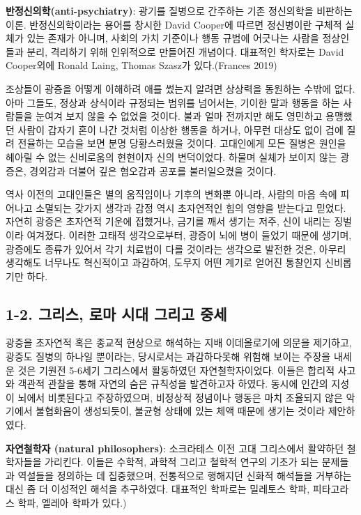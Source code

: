 \documentclass[
]{article}
\begin{document}
\textbf{반정신의학(anti-psychiatry)}: 광기를 질병으로 간주하는 기존
정신의학을 비판하는 이론. 반정신의학이라는 용어를 창시한 David Cooper에
따르면 정신병이란 구체적 실체가 있는 존재가 아니며, 사회의 가치 기준이나
행동 규범에 어긋나는 사람을 정상인들과 분리, 격리하기 위해 인위적으로
만들어진 개념이다. 대표적인 학자로는 David Cooper외에 Ronald Laing,
Thomas Szasz가 있다.(Frances 2019)

조상들이 광증을 어떻게 이해하려 애를 썼는지 알려면 상상력을 동원하는
수밖에 없다. 아마 그들도, 정상과 상식이라 규정되는 범위를 넘어서는,
기이한 말과 행동을 하는 사람들을 눈여겨 보지 않을 수 없었을 것이다. 불과
얼마 전까지만 해도 영민하고 용맹했던 사람이 갑자기 혼이 나간 것처럼
이상한 행동을 하거나, 아무런 대상도 없이 겁에 질려 전율하는 모습을 보면
분명 당황스러웠을 것이다. 고대인에게 모든 질병은 원인을 헤아릴 수 없는
신비로움의 현현이자 신의 변덕이었다. 하물며 실체가 보이지 않는 광증은,
경외감과 더불어 깊은 혐오감과 공포를 불러일으켰을 것이다.

역사 이전의 고대인들은 별의 움직임이나 기후의 변화뿐 아니라, 사람의 마음
속에 피어나고 소멸되는 갖가지 생각과 감정 역시 초자연적인 힘의 영향을
받는다고 믿었다. 자연히 광증은 초자연적 기운에 접했거나, 금기를 깨서
생기는 저주, 신이 내리는 징벌이라 여겨졌다. 이러한 고태적 생각으로부터,
광증이 뇌에 병이 들었기 때문에 생기며, 광증에도 종류가 있어서 각기
치료법이 다를 것이라는 생각으로 발전한 것은, 아무리 생각해도 너무나도
혁신적이고 과감하여, 도무지 어떤 계기로 얻어진 통찰인지 신비롭기만 하다.

\hypertarget{uxadf8uxb9acuxc2a4-uxb85cuxb9c8-uxc2dcuxb300-uxadf8uxb9acuxace0-uxc911uxc138}{%
\subsection{1-2. 그리스, 로마 시대 그리고
중세}\label{uxadf8uxb9acuxc2a4-uxb85cuxb9c8-uxc2dcuxb300-uxadf8uxb9acuxace0-uxc911uxc138}}

광증을 초자연적 혹은 종교적 현상으로 해석하는 지배 이데올로기에 의문을
제기하고, 광증도 질병의 하나일 뿐이라는, 당시로서는 과감하다못해 위험해
보이는 주장을 내세운 것은 기원전 5-6세기 그리스에서 활동하였던
자연철학자이었다. 이들은 합리적 사고와 객관적 관찰을 통해 자연의 숨은
규칙성을 발견하고자 하였다. 동시에 인간의 지성이 뇌에서 비롯된다고
주장하였으며, 비정상적 정념이나 행동은 마치 조율되지 않은 악기에서
불협화음이 생성되듯이, 불균형 상태에 있는 체액 때문에 생기는 것이라
제안하였다.

\textbf{자연철학자 (natural philosophers)}: 소크라테스 이전 고대
그리스에서 활약하던 철학자들을 가리킨다. 이들은 수학적, 과학적 그리고
철학적 연구의 기초가 되는 문제들과 역설들을 정의하는 데 집중했으며,
전통적으로 행해지던 신화적 해석들을 거부하는 대신 좀 더 이성적인 해석을
추구하였다. 대표적인 학파로는 밀레토스 학파, 피타고라스 학파, 엘레아
학파가 있다.)
\end{document}
